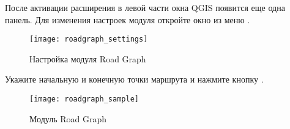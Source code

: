 После активации расширения в левой части окна QGIS появится еще одна панель.
Для изменения настроек модуля откройте окно 
из меню  \arrow {}.

\begin{figure}[ht]
    \centering
    \texttt{[image: roadgraph\_settings]}
    \caption{Настройка модуля Road Graph \nixcaption}\label{fig:roadgraphsettings}
\end{figure}

Укажите начальную и конечную точки маршрута и нажмите кнопку .

\begin{figure}[ht]
    \centering
    \texttt{[image: roadgraph\_sample]}
    \caption{Модуль Road Graph \nixcaption}\label{fig:roadgraphsample}
\end{figure}

\FloatBarrier
